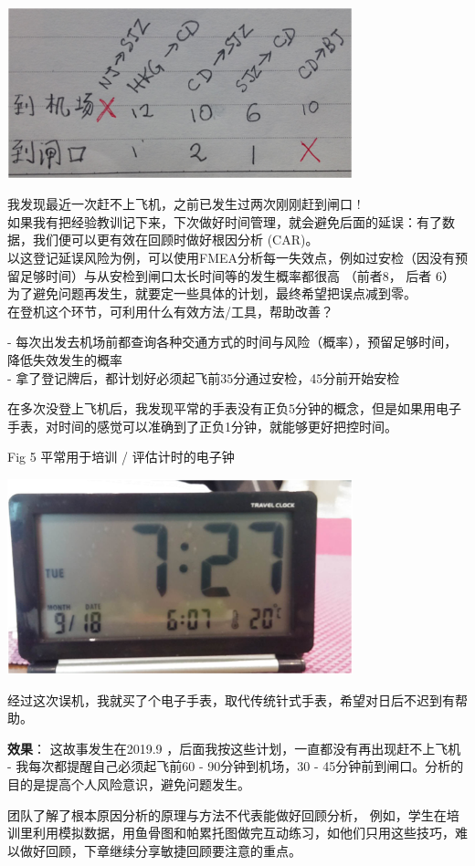 
\includegraphics[width=10cm]{风险与机会4.png}

我发现最近一次赶不上飞机，之前已发生过两次刚刚赶到闸口 !\\
如果我有把经验教训记下来，下次做好时间管理，就会避免后面的延误：有了数据，我们便可以更有效在回顾时做好根因分析
(CAR)。\\
以这登记延误风险为例，可以使用FMEA分析每一失效点，例如过安检（因没有预留足够时间）与从安检到闸口太长时间等的发生概率都很高
（前者8， 后者 6）\\
为了避免问题再发生，就要定一些具体的计划，最终希望把误点减到零。\\
在登机这个环节，可利用什么有效方法/工具，帮助改善？

-
每次出发去机场前都查询各种交通方式的时间与风险（概率），预留足够时间，降低失效发生的概率\\
- 拿了登记牌后，都计划好必须起飞前35分通过安检，45分前开始安检

在多次没登上飞机后，我发现平常的手表没有正负5分钟的概念，但是如果用电子手表，对时间的感觉可以准确到了正负1分钟，就能够更好把控时间。

Fig 5 平常用于培训 / 评估计时的电子钟


\includegraphics[width=10cm]{风险与机会5_闹钟.png}

经过这次误机，我就买了个电子手表，取代传统针式手表，希望对日后不迟到有帮助。

\textbf{效果}： 这故事发生在2019.9
，后面我按这些计划，一直都没有再出现赶不上飞机 -
我每次都提醒自己必须起飞前60 - 90分钟到机场，30 -
45分钟前到闸口。分析的目的是提高个人风险意识，避免问题发生。

团队了解了根本原因分析的原理与方法不代表能做好回顾分析，
例如，学生在培训里利用模拟数据，用鱼骨图和帕累托图做完互动练习，如他们只用这些技巧，难以做好回顾，下章继续分享敏捷回顾要注意的重点。




